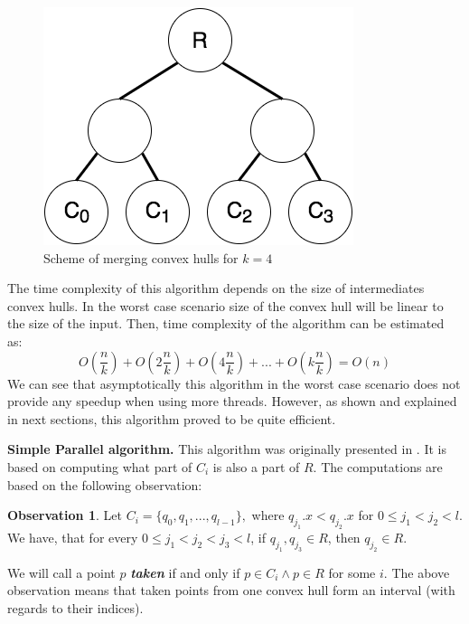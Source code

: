 \documentclass[letterpaper]{article}
\newcommand{\mypar}[1]{{\bf #1.}}
\theoremstyle{definition}
\newtheorem{observation}{Observation}
\begin{document}
\begin{figure}\centering
  \includegraphics[scale=0.5]{img/naive-parallel}
  \caption{Scheme of merging convex hulls for $k=4$}
  \label{fig:naive-parallel-scheme}
\end{figure}

The time complexity of this algorithm depends on the size of intermediates convex hulls.
In the worst case scenario size of the convex hull will be linear to the size of the input.
Then, time complexity of the algorithm can be estimated as:
$$O(\frac{n}{k}) + O(2\frac{n}{k}) + O(4\frac{n}{k}) + ... + O(k\frac{n}{k}) = O(n)$$
We can see that asymptotically this algorithm in the worst case scenario does not provide any speedup when using more threads.
However, as shown and explained in next sections, this algorithm proved to be quite efficient.

\mypar{Simple Parallel algorithm}
This algorithm was originally presented in \cite{SimpleParallel}.
It is based on computing what part of $C_i$ is also a part of $R$.
The computations are based on the following observation:
\begin{observation}
Let $C_i = \{q_0, q_1, ..., q_{l-1} \},$ where  $q_{j_1}.x < q_{j_2}.x$ for $0 \leq j_1 < j_2 < l$. 
We have, that for every $0 \leq j_1 < j_2 < j_3 < l$, if $q_{j_1}, q_{j_3} \in R$, then $q_{j_2} \in R$.
\end{observation}
We will call a point $p$ {\it\bf taken} if and only if $p \in C_i \land p \in R$ for some $i$. 
The above observation means that taken points from one convex hull form an interval (with regards to their indices).
\end{document}
